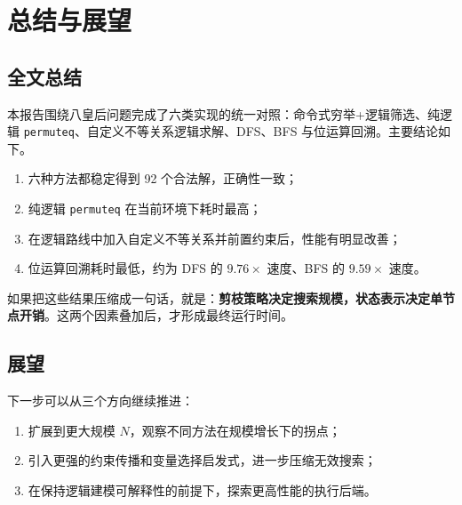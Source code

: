﻿\chapter{总结与展望}\label{chap:conclusion}

\section{全文总结}

本报告围绕八皇后问题完成了六类实现的统一对照：命令式穷举+逻辑筛选、纯逻辑 \texttt{permuteq}、自定义不等关系逻辑求解、DFS、BFS 与位运算回溯。主要结论如下。

\begin{enumerate}
    \item 六种方法都稳定得到 92 个合法解，正确性一致；
    \item 纯逻辑 \texttt{permuteq} 在当前环境下耗时最高；
    \item 在逻辑路线中加入自定义不等关系并前置约束后，性能有明显改善；
    \item 位运算回溯耗时最低，约为 DFS 的 $9.76\times$ 速度、BFS 的 $9.59\times$ 速度。
\end{enumerate}

如果把这些结果压缩成一句话，就是：\textbf{剪枝策略决定搜索规模，状态表示决定单节点开销}。这两个因素叠加后，才形成最终运行时间。

\section{展望}

下一步可以从三个方向继续推进：

\begin{enumerate}
    \item 扩展到更大规模 $N$，观察不同方法在规模增长下的拐点；
    \item 引入更强的约束传播和变量选择启发式，进一步压缩无效搜索；
    \item 在保持逻辑建模可解释性的前提下，探索更高性能的执行后端。
\end{enumerate}
